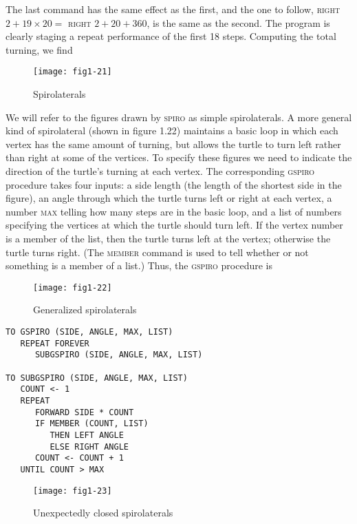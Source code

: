 \documentclass{book}
\begin{document}
The last command has the same effect as the first, and the one to follow,
\textsc{right} $2 + 19 \times 20 =$ \textsc{right} $2 + 20 + 360$, is the same as the
second. The program is clearly staging a repeat performance of the first
18 steps. Computing the total turning, we find

\begin{figure}
\begin{center}
\texttt{[image: fig1-21]}
\caption{Spirolaterals}
\end{center}
\end{figure}

We will refer to the figures drawn by \textsc{spiro} as simple spirolaterals. A
more general kind of spirolateral (shown in figure 1.22) maintains a basic
loop in which each vertex has the same amount of turning, but allows the
turtle to turn left rather than right at some of the vertices. To specify
these figures we need to indicate the direction of the turtle's turning
at each vertex. The corresponding \textsc{gspiro} procedure takes four inputs:
a side length (the length of the shortest side in the figure), an angle
through which the turtle turns left or right at each vertex, a number
\textsc{max} telling how many steps are in the basic loop, and a list of numbers
specifying the vertices at which the turtle should turn left. If the vertex
number is a member of the list, then the turtle turns left at the vertex;
otherwise the turtle turns right. (The \textsc{member} command is used to tell
whether or not something is a member of a list.) Thus, the \textsc{gspiro}
procedure is

\begin{figure}
\begin{center}
\texttt{[image: fig1-22]}
\caption{Generalized spirolaterals}
\end{center}
\end{figure}

\begin{verbatim}
TO GSPIRO (SIDE, ANGLE, MAX, LIST)
   REPEAT FOREVER
      SUBGSPIRO (SIDE, ANGLE, MAX, LIST)

TO SUBGSPIRO (SIDE, ANGLE, MAX, LIST)
   COUNT <- 1
   REPEAT
      FORWARD SIDE * COUNT
      IF MEMBER (COUNT, LIST)
         THEN LEFT ANGLE
         ELSE RIGHT ANGLE
      COUNT <- COUNT + 1
   UNTIL COUNT > MAX
\end{verbatim}
\begin{figure}
\begin{center}
\texttt{[image: fig1-23]}
\caption{Unexpectedly closed spirolaterals}
\end{center}
\end{figure}
\end{document}
